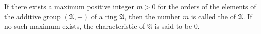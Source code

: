 If there exists a maximum positive integer $m > 0$ for the orders of the elements of the additive group $(\mathfrak{A}, +)$ of a ring $\mathfrak{A}$, then the number $m$ is called the  of $\mathfrak{A}$. If no such maximum exists, the characteristic of $\mathfrak{A}$ is said to be $0$.

